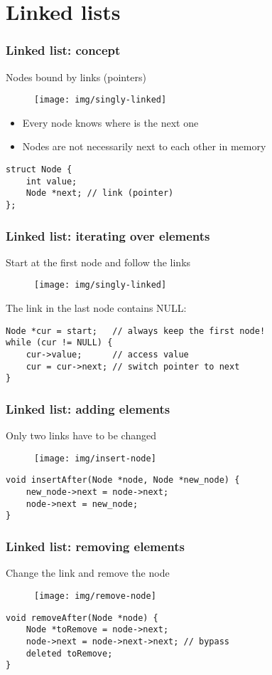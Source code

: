 \documentclass[12pt]{beamer}
\begin{document}
\section{Linked lists}

\begin{frame}[fragile]
\frametitle{Linked list: concept}
Nodes bound by links (pointers)
\begin{figure}
\centering
\texttt{[image: img/singly-linked]}
\end{figure}
\begin{itemize}
\item Every node knows where is the next one
\item Nodes are not necessarily next to each other in memory
\end{itemize}
\begin{lstlisting}
struct Node {
    int value;
    Node *next; // link (pointer)
};
\end{lstlisting}
\end{frame}

\begin{frame}[fragile]
\frametitle{Linked list: iterating over elements}
Start at the first node and follow the links
\begin{figure}
\centering
\texttt{[image: img/singly-linked]}
\end{figure}
The link in the last node contains NULL:
\begin{lstlisting}
Node *cur = start;   // always keep the first node!
while (cur != NULL) {
    cur->value;      // access value
    cur = cur->next; // switch pointer to next
}
\end{lstlisting}
\end{frame}

\begin{frame}[fragile]
\frametitle{Linked list: adding elements}
Only two links have to be changed
\begin{figure}
\centering
\texttt{[image: img/insert-node]}
\end{figure}
\begin{lstlisting}
void insertAfter(Node *node, Node *new_node) {
    new_node->next = node->next;
    node->next = new_node;
}
\end{lstlisting}
\end{frame}

\begin{frame}[fragile]
\frametitle{Linked list: removing elements}
Change the link and remove the node
\begin{figure}
\centering
\texttt{[image: img/remove-node]}
\end{figure}
\begin{lstlisting}
void removeAfter(Node *node) {
    Node *toRemove = node->next;
    node->next = node->next->next; // bypass
    deleted toRemove;
}
\end{lstlisting}
\end{frame}
\end{document}
